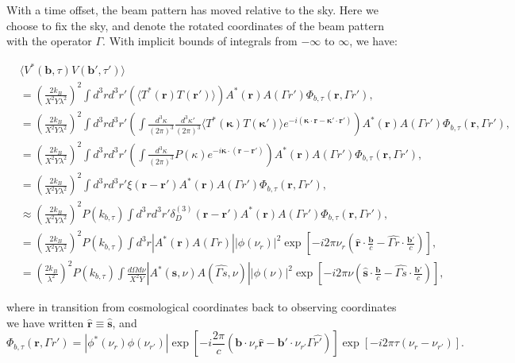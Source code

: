 \documentclass[preprint2,numberedappendix,tighten,twocolappendix]{aastex6}  %
\renewcommand\[{\begin{equation}}
\renewcommand\]{\end{equation}}
\begin{document}
With a time offset, the beam pattern has moved relative to the sky.
Here we choose to fix the sky, and denote the rotated coordinates
of the beam pattern with the operator $\Gamma$. With implicit bounds
of integrals from $-\infty$ to $\infty$, we have:
\begin{widetext}
\begin{equation}
\begin{aligned} & \langle V^{*}(\boldsymbol{b},\tau)V(\boldsymbol{b'},\tau')\rangle\\
 & =\left(\frac{2k_{B}}{X^{2}Y\lambda^{2}}\right)^{2}\int d^{3}rd^{3}r'\left(\langle T^{*}(\boldsymbol{r})T(\boldsymbol{r'})\rangle\right)A^{*}(\boldsymbol{r})A(\Gamma r')\Phi_{b,\tau}(\boldsymbol{r},\Gamma r'),\\
 & =\left(\frac{2k_{B}}{X^{2}Y\lambda^{2}}\right)^{2}\int d^{3}rd^{3}r'\left(\int\frac{d^{3}\kappa}{(2\pi)^{3}}\frac{d^{3}\kappa'}{(2\pi)^{3}}\langle T^{*}(\boldsymbol{\kappa})T(\boldsymbol{\kappa'})\rangle e^{-i(\boldsymbol{\kappa}\cdot \boldsymbol{r}-\boldsymbol{\kappa'}\cdot\boldsymbol{r'})}\right)A^{*}(\boldsymbol{r})A(\Gamma r')\Phi_{b,\tau}(\boldsymbol{r},\Gamma r'),\\
 & =\left(\frac{2k_{B}}{X^{2}Y\lambda^{2}}\right)^{2}\int d^{3}rd^{3}r'\left(\int\frac{d^{3}\kappa}{(2\pi)^{3}}P(\kappa)e^{-i\boldsymbol{\kappa}\cdot(\boldsymbol{r}-\boldsymbol{r'})}\right)A^{*}(\boldsymbol{r})A(\Gamma r')\Phi_{b,\tau}(\boldsymbol{r},\Gamma r'),\\
 & =\left(\frac{2k_{B}}{X^{2}Y\lambda^{2}}\right)^{2}\int d^{3}rd^{3}r'\xi(\boldsymbol{r}-\boldsymbol{r'})A^{*}(\boldsymbol{r})A(\Gamma r')\Phi_{b,\tau}(\boldsymbol{r},\Gamma r'),\\
 & \approx\left(\frac{2k_{B}}{X^{2}Y\lambda^{2}}\right)^{2}P(k_{b,\tau})\int d^{3}rd^{3}r'\delta_{D}^{(3)}(\boldsymbol{r}-\boldsymbol{r'})A^{*}(\boldsymbol{r})A(\Gamma r')\Phi_{b,\tau}(\boldsymbol{r},\Gamma r'),\\
 & =\left(\frac{2k_{B}}{X^{2}Y\lambda^{2}}\right)^{2}P(k_{b,\tau})\int d^{3}r|A^{*}(\boldsymbol{r})A(\Gamma r)||\phi(\nu_{r})|^{2}\exp\left[-i2\pi\nu_{r}\left(\hat{\boldsymbol{r}}\cdot\frac{\boldsymbol{b}}{c}-\hat{\Gamma r}\cdot\frac{\boldsymbol{b'}}{c}\right)\right],\\
 & =\left(\frac{2k_{B}}{\lambda^{2}}\right)^{2}P(k_{b,\tau})\int\frac{d\Omega d\nu}{X^{2}Y}|A^{*}(\hat{\boldsymbol{s}},\nu)A(\hat{\Gamma s},\nu)||\phi(\nu)|^{2}\exp\left[-i2\pi\nu\left(\hat{\boldsymbol{s}}\cdot\frac{\boldsymbol{b}}{c}-\hat{\Gamma s}\cdot\frac{\boldsymbol{b'}}{c}\right)\right],
\end{aligned}
\label{eq:main}
\end{equation}

where in transition from cosmological coordinates back to observing coordinates we have written $\hat{\boldsymbol{r}}\equiv\hat{\boldsymbol{s}}$, and 
\begin{equation}
\Phi_{b,\tau}(\boldsymbol{r},\Gamma r')=|{\phi^{*}}(\ensuremath{\nu_{r}})\phi(\nu_{r'})|\exp\left[-i\frac{2\pi}{c}\left(\boldsymbol{b}\cdot\nu_{r}\hat{\boldsymbol{r}}-\boldsymbol{b'}\cdot\nu_{r'}\Gamma\hat{r'}\right)\right]\exp\left[-i2\pi\tau\left(\nu_{r}-\nu_{r'}\right)\right].
\end{equation}
\end{widetext}
\end{document}
